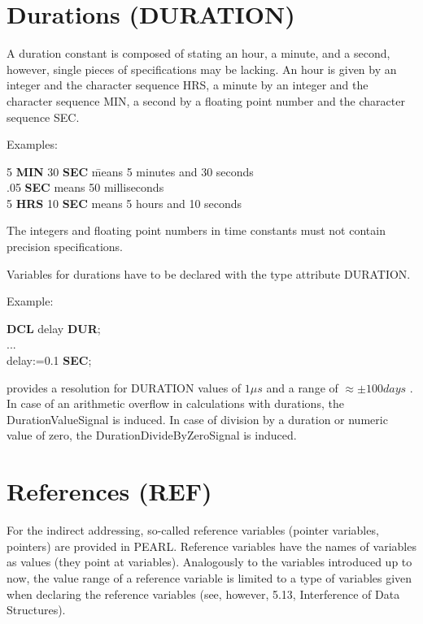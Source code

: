 \section{Durations (DURATION)}   %
\label{sec_type_duration}

A duration constant is composed of stating an hour, a minute, and a
second, however, single pieces of specifications may be lacking. An hour
is given by an integer and the character sequence HRS, a minute by an
integer and the character sequence MIN, a second by a floating point
number and the character sequence SEC.

Examples:

\begin{tabbing}
5 {\bf MIN} 30 {\bf SEC} \= means 5 minutes and 30 seconds \\
.05 {\bf SEC}            \> means 50 milliseconds \\
5 {\bf HRS} 10 {\bf SEC} \> means 5 hours and 10 seconds
\end{tabbing}

The integers and floating point numbers in time constants must not
contain precision specifications.

Variables for durations have to be declared with the type attribute
DURATION.



Example:

{\bf DCL} delay {\bf DUR};\\
...\\
delay:=0.1 {\bf SEC};

\OpenPEARL{} provides a resolution for DURATION values of $1\mu s$ 
and
a range of $\approx \pm 100 days$ .
In case of an arithmetic overflow in calculations with durations, the
DurationValueSignal is induced.
In case of division by a duration or numeric value of zero, 
the DurationDivideByZeroSignal is induced.

\section{References (REF)}  %
\label{sec_references}

For the indirect addressing, so-called reference variables (pointer
variables, pointers) are provided in PEARL. Reference variables have the
names of variables as values (they point at variables). Analogously to
the variables introduced up to now, the value range of a reference
variable is limited to a type of variables given when declaring the
reference variables (see, however, 5.13, Interference of Data
Structures).

